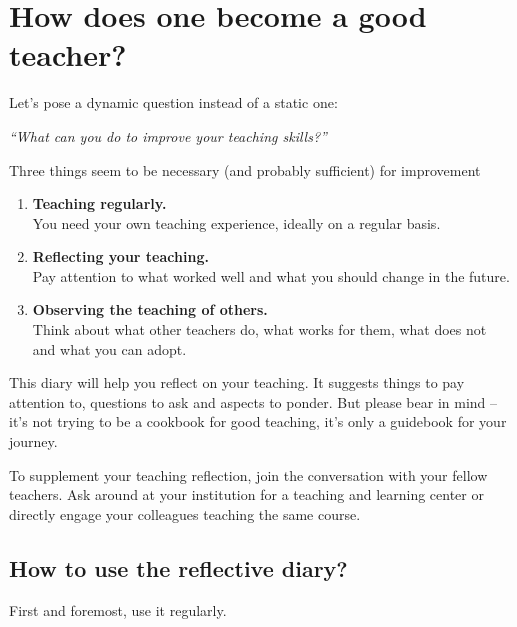 
\chapter*{How does one become a good teacher?}

\vspace*{1em}
Let's pose a dynamic question instead of a static one:

\vspace*{1em}
\textit{\large \enquote{What can you do to improve your teaching skills?}}

\vspace*{1em}
Three things seem to be necessary (and probably sufficient) for improvement\footnotemark
{}
\begin{enumerate}
\item \textbf{Teaching regularly.}\\You need your own teaching experience, ideally on a regular basis.
\item \textbf{Reflecting your teaching.}\\Pay attention to what worked well and what you should change in the future.
\item \textbf{Observing the teaching of others.}\\Think about what other teachers do, what works for them, what does not and what you can adopt.
\end{enumerate}

This diary will help you reflect on your teaching. It suggests things to pay attention to, questions to ask and aspects to ponder. But please bear in mind -- it's not trying to be a cookbook for good teaching, it's only a guidebook for your journey.

To supplement your teaching reflection, join the conversation with your fellow teachers. Ask around at your institution for a teaching and learning center or directly engage your colleagues teaching the same course.

\newpage
\section*{How to use the reflective diary?}

First and foremost, use it regularly.

